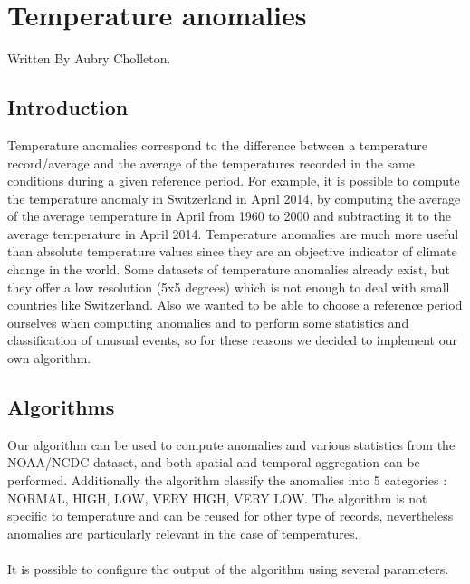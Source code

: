 \section{Temperature anomalies}
Written By Aubry Cholleton.
\subsection{Introduction}

Temperature anomalies correspond to the difference between a temperature record/average
and the average of the temperatures recorded in the same conditions during a given reference period.
For example, it is possible to compute the temperature anomaly in Switzerland in April 2014, by
computing the average of the average temperature in April from 1960 to 2000 and subtracting it to the
average temperature in April 2014. Temperature anomalies are much more useful than absolute temperature values since
 they are an objective indicator of climate change in the world.
Some datasets of temperature anomalies already exist, but they offer a
low resolution (5x5 degrees) which is not enough to deal with small countries like Switzerland.
Also we wanted to be able to choose a reference period ourselves when computing anomalies and to perform some statistics and classification of unusual events, so for these reasons we decided to implement our own algorithm.

\subsection{Algorithms}

Our algorithm can be used to compute anomalies and various statistics from the NOAA/NCDC dataset, and both spatial and temporal aggregation
can be performed. Additionally the algorithm classify the anomalies into 5 categories : NORMAL, HIGH, LOW, VERY HIGH, VERY LOW.
The algorithm is not specific to temperature and can be reused for other type of records, nevertheless anomalies are particularly relevant in the case of temperatures.\\
\\It is possible to configure the output of the algorithm using several parameters.

